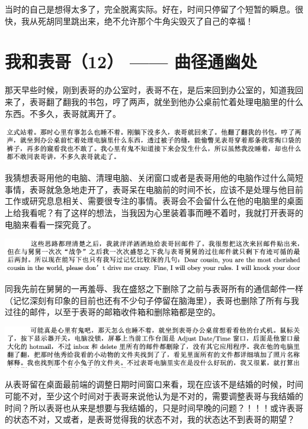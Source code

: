 \documentclass[9pt, b5paper]{article}
\begin{document}
当时的自己是想得太多了，完全脱离实际。好在，时间只停留了个短暂的瞬息。很快，我从死胡同里跳出来，绝不允许那个牛角尖毁灭了自己的幸福！

\section{我和表哥（12） —— 曲径通幽处}
\label{sec:orgb3c3081}

那天早些时候，刚到表哥的办公室时，表哥不在，是后来回到办公室的，知道我回来了，表哥翻了翻我的书包，哼了两声，就坐到他办公桌前忙着处理电脑里的什么东西。不多久，表哥就离开了。

\begin{center}
\includegraphics[width=.9\linewidth]{./pic/p1p67-0.png}
\end{center}

我猜想表哥用他的电脑、清理电脑、关闭窗口或者是表哥用他的电脑作过什么简短事情，表哥就急急地走开了，表哥呆在电脑前的时间不长，应该不是处理与他目前工作或研究息息相关、需要很专注的事情。表哥会不会留什么在他的电脑里的桌面上给我看呢？有了这样的想法，当我因为心里装着事而睡不着时，我就打开表哥的电脑来看看一探究竟了。 

\begin{center}
\includegraphics[width=.9\linewidth]{./pic/p1p55-3.png}
\end{center}

同我先前在舅舅的一再羞辱、我在盛怒之下删除了之前与表哥所有的通信邮件一样（记忆深刻有印象的目前也还有不少句子停留在脑海里），表哥也删除了所有与我过往的邮件，以至于表哥的邮箱收件箱和删除箱都是空的。 

\begin{center}
\includegraphics[width=.9\linewidth]{./pic/p1p67-8.png}
\end{center}

从表哥留在桌面最前端的调整日期时间窗口来看，现在应该不是结婚的时候，时间可能不对，至少这个时间对于表哥来说他认为是不对的，需要调整表哥与我结婚的时间？所以表哥也从来是想要与我结婚的，只是时间早晚的问题？！！！或许表哥的状态不对，又或者，是表哥觉得我的状态不对，我的状态达不到表哥的期望？
\end{document}
